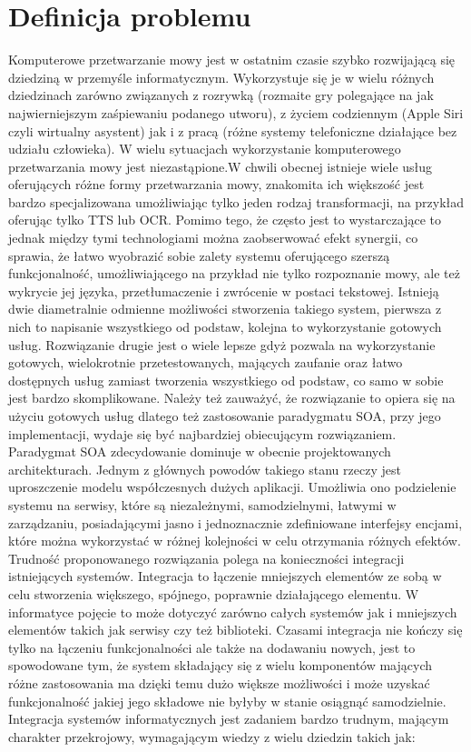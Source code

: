 \section{Definicja problemu} %
Komputerowe przetwarzanie mowy jest w ostatnim czasie szybko rozwijającą się dziedziną w przemyśle informatycznym. Wykorzystuje się je w wielu różnych dziedzinach zarówno związanych z rozrywką (rozmaite gry polegające na jak najwierniejszym zaśpiewaniu podanego utworu), z życiem codziennym (Apple Siri czyli wirtualny asystent) jak i z pracą (różne systemy telefoniczne działające bez udziału człowieka). W wielu sytuacjach wykorzystanie komputerowego przetwarzania mowy jest niezastąpione.W chwili obecnej istnieje wiele usług oferujących różne formy przetwarzania mowy, znakomita ich większość jest bardzo specjalizowana umożliwiając tylko jeden rodzaj transformacji, na przykład oferując tylko TTS lub OCR. Pomimo tego, że często jest to wystarczające to jednak między tymi technologiami można zaobserwować efekt synergii, co sprawia, że łatwo wyobrazić sobie zalety systemu oferującego szerszą funkcjonalność, umożliwiającego na przykład nie tylko rozpoznanie mowy, ale też wykrycie jej języka, przetłumaczenie i zwrócenie w postaci tekstowej. Istnieją dwie diametralnie odmienne możliwości stworzenia takiego system, pierwsza z nich to napisanie wszystkiego od podstaw, kolejna to wykorzystanie gotowych usług. Rozwiązanie drugie jest o wiele lepsze gdyż pozwala na wykorzystanie gotowych, wielokrotnie przetestowanych, mających zaufanie oraz łatwo dostępnych usług zamiast tworzenia wszystkiego od podstaw, co samo w sobie jest bardzo skomplikowane. Należy też zauważyć, że rozwiązanie to opiera się na użyciu gotowych usług dlatego też zastosowanie paradygmatu SOA, przy jego implementacji, wydaje się być najbardziej obiecującym rozwiązaniem. Paradygmat SOA zdecydowanie dominuje w obecnie projektowanych architekturach. Jednym z głównych powodów takiego stanu rzeczy jest uproszczenie modelu współczesnych dużych aplikacji. Umożliwia ono podzielenie systemu na serwisy, które są niezależnymi, samodzielnymi, łatwymi w zarządzaniu, posiadającymi jasno i jednoznacznie zdefiniowane interfejsy encjami, które można wykorzystać w różnej kolejności w celu otrzymania różnych efektów. Trudność proponowanego rozwiązania polega na konieczności integracji istniejących systemów. Integracja to łączenie mniejszych elementów ze sobą w celu stworzenia większego, spójnego, poprawnie działającego elementu. W informatyce pojęcie to może dotyczyć zarówno całych systemów jak i mniejszych elementów takich jak serwisy czy też biblioteki. Czasami integracja nie kończy się tylko na łączeniu funkcjonalności ale także na dodawaniu nowych, jest to spowodowane tym, że system składający się z wielu komponentów mających różne zastosowania ma dzięki temu dużo większe możliwości i może uzyskać funkcjonalność jakiej jego składowe nie byłyby w stanie osiągnąć samodzielnie. Integracja systemów informatycznych jest zadaniem bardzo trudnym, mającym charakter przekrojowy, wymagającym wiedzy z wielu dziedzin takich jak:
